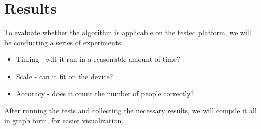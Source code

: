 \documentclass{article}
\begin{document}
\section{Results}

To evaluate whether the algorithm is applicable on the tested platform, we will be conducting a series of experiments:
\begin{itemize}
\item Timing - will it run in a reasonable amount of time?
\item Scale - can it fit on the device?
\item Accuracy - does it count the number of people correctly?
\end{itemize}

After running the tests and collecting the necessary results, we will compile it all in graph form, for easier visualization. 


\end{document}
